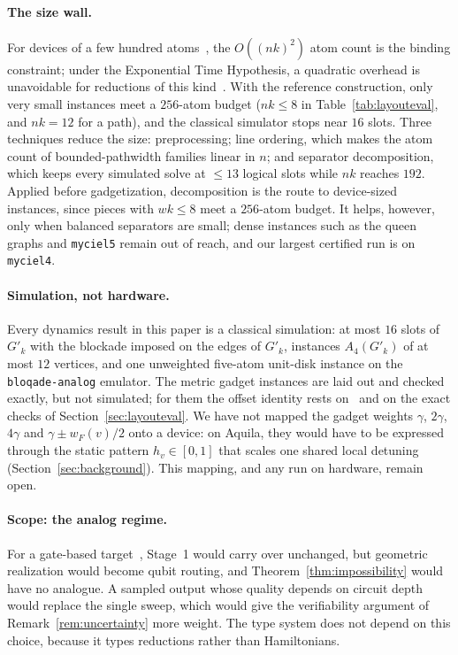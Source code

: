 \documentclass[a4paper,fleqn]{cas-sc}
\begin{document}
\paragraph{The size wall.} For devices of a few hundred atoms~\cite{Wurtz2023}, the
$O((nk)^2)$ atom count is the binding constraint; under the Exponential Time
Hypothesis, a quadratic overhead is unavoidable for reductions of this
kind~\cite{Cazals2025}. With the reference construction, only very small instances
meet a $256$-atom budget ($nk\le8$ in Table~\ref{tab:layouteval}, and $nk=12$ for a
path), and the classical simulator stops near $16$ slots. Three techniques reduce the
size: preprocessing; line ordering, which makes the atom count of bounded-pathwidth
families linear in $n$; and separator decomposition, which keeps every simulated solve
at $\le13$ logical slots while $nk$ reaches $192$. Applied before gadgetization,
decomposition is the route to device-sized instances, since pieces with $wk\le8$ meet a
$256$-atom budget. It helps, however, only when balanced separators are small; dense
instances such as the queen graphs and \texttt{myciel5} remain out of reach, and our
largest certified run is on \texttt{myciel4}.

\paragraph{Simulation, not hardware.} Every dynamics result in this paper is a
classical simulation: at most $16$ slots of $G'_k$ with the blockade imposed on the
edges of $G'_k$, instances $A_4(G'_k)$ of at most $12$ vertices, and one unweighted
five-atom unit-disk instance on the \texttt{bloqade-analog} emulator. The metric
gadget instances are laid out and checked exactly, but not simulated; for them the
offset identity rests on~\cite{Nguyen2023} and on the exact checks of
Section~\ref{sec:layouteval}. We have not mapped the gadget weights $\gamma$,
$2\gamma$, $4\gamma$ and $\gamma\pm w_F(v)/2$ onto a device: on Aquila, they would
have to be expressed through the static pattern $h_v\in[0,1]$ that scales one shared
local detuning (Section~\ref{sec:background}). This mapping, and any run on hardware,
remain open.

\paragraph{Scope: the analog regime.} For a gate-based target~\cite{Graham2022},
Stage~1 would carry over unchanged, but geometric realization would become qubit
routing, and Theorem~\ref{thm:impossibility} would have no analogue. A sampled output
whose quality depends on circuit depth would replace the single sweep, which would
give the verifiability argument of Remark~\ref{rem:uncertainty} more weight. The type
system does not depend on this choice, because it types reductions rather than
Hamiltonians.
\end{document}
